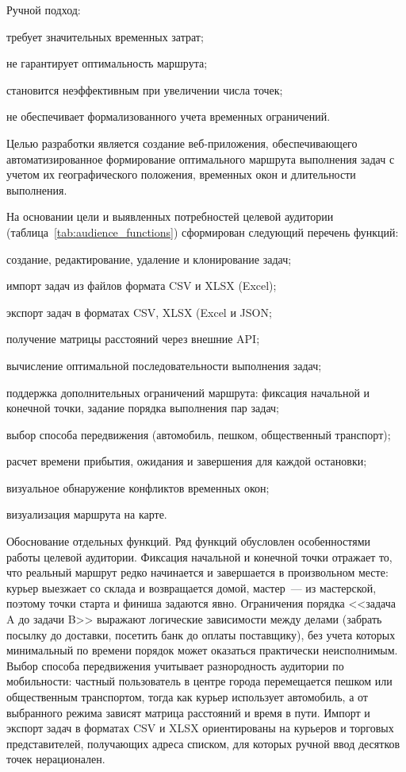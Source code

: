 Ручной подход:

\begin{compactlist}
  \item требует значительных временных затрат;
  \item не гарантирует оптимальность маршрута;
  \item становится неэффективным при увеличении числа точек;
  \item не обеспечивает формализованного учета временных ограничений.
\end{compactlist}

Целью разработки является создание веб-приложения, обеспечивающего
автоматизированное формирование оптимального маршрута выполнения задач
с учетом их географического положения, временных окон и длительности выполнения.

На основании цели и выявленных потребностей целевой аудитории
(таблица~\ref{tab:audience_functions}) сформирован следующий перечень функций:

\begin{compactlist}
  \item создание, редактирование, удаление и клонирование задач;
  \item импорт задач из файлов формата CSV и XLSX (Excel);
  \item экспорт задач в форматах CSV, XLSX (Excel и JSON;
  \item получение матрицы расстояний через внешние API;
  \item вычисление оптимальной последовательности выполнения задач;
  \item поддержка дополнительных ограничений маршрута: фиксация начальной и конечной точки, задание порядка выполнения пар задач;
  \item выбор способа передвижения (автомобиль, пешком, общественный транспорт);
  \item расчет времени прибытия, ожидания и завершения для каждой остановки;
  \item визуальное обнаружение конфликтов временных окон;
  \item визуализация маршрута на карте.
\end{compactlist}

Обоснование отдельных функций. Ряд функций обусловлен особенностями работы
целевой аудитории. Фиксация начальной и конечной точки отражает то, что
реальный маршрут редко начинается и завершается в произвольном месте: курьер
выезжает со склада и возвращается домой, мастер~--- из мастерской, поэтому
точки старта и финиша задаются явно. Ограничения порядка <<задача A до
задачи B>> выражают логические зависимости между делами (забрать посылку до
доставки, посетить банк до оплаты поставщику), без учета которых минимальный
по времени порядок может оказаться практически неисполнимым. Выбор способа
передвижения учитывает разнородность аудитории по мобильности: частный
пользователь в центре города перемещается пешком или общественным транспортом,
тогда как курьер использует автомобиль, а от выбранного режима зависят матрица
расстояний и время в пути. Импорт и экспорт задач в форматах CSV и XLSX
ориентированы на курьеров и торговых представителей, получающих адреса списком,
для которых ручной ввод десятков точек нерационален.

